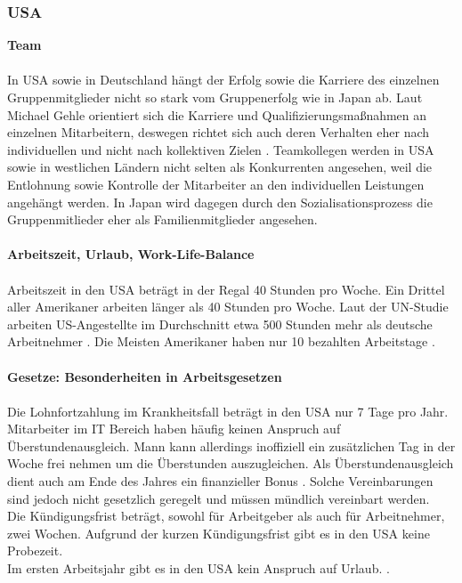 	\subsubsection{USA}
	\textbf{Team}\\
	\\
	In USA sowie in Deutschland hängt der Erfolg sowie die Karriere des einzelnen Gruppenmitglieder nicht so stark vom Gruppenerfolg wie in Japan ab. Laut Michael Gehle orientiert sich die  Karriere und Qualifizierungsmaßnahmen an einzelnen Mitarbeitern, deswegen richtet sich auch deren Verhalten eher nach individuellen und nicht nach kollektiven Zielen \cite[233]{3LaenderVergl}. 
	Teamkollegen werden in USA sowie in westlichen Ländern nicht selten als Konkurrenten angesehen, weil die Entlohnung sowie Kontrolle der Mitarbeiter an den individuellen Leistungen angehängt werden. In Japan wird dagegen durch den Sozialisationsprozess die Gruppenmitlieder eher als Familienmitglieder angesehen.\\
	 \\
		\textbf{Arbeitszeit, Urlaub, Work-Life-Balance}\\
		\\
	Arbeitszeit in den USA beträgt in der Regal 40 Stunden pro Woche. 
	Ein Drittel aller Amerikaner arbeiten länger als 40 Stunden pro Woche.
	Laut der UN-Studie arbeiten US-Angestellte im Durchschnitt etwa 500 Stunden mehr als deutsche Arbeitnehmer \cite{ArbeitsumgUSA}. Die Meisten Amerikaner haben nur 10 bezahlten Arbeitstage \cite{InfoUSArbVertr}.\\ \\
	\textbf{Gesetze: Besonderheiten in Arbeitsgesetzen}\\
		\\
		Die Lohnfortzahlung im Krankheitsfall beträgt in den USA nur 7 Tage pro Jahr. 
		Mitarbeiter im IT Bereich haben häufig keinen Anspruch auf Überstundenausgleich. Mann kann allerdings inoffiziell ein zusätzlichen Tag in der Woche frei nehmen um die Überstunden auszugleichen. Als Überstundenausgleich dient auch am Ende des Jahres ein finanzieller Bonus \cite{InfoUSArbVertr}.
		Solche Vereinbarungen sind jedoch nicht gesetzlich geregelt und müssen mündlich vereinbart werden.\\
		Die Kündigungsfrist beträgt, sowohl für Arbeitgeber als auch für 
		Arbeitnehmer, zwei Wochen. Aufgrund der kurzen Kündigungsfrist gibt es in den USA keine Probezeit.\\
		Im ersten Arbeitsjahr gibt es in den USA kein Anspruch auf Urlaub. \cite{USA_Tipps}.
		\\ \\
